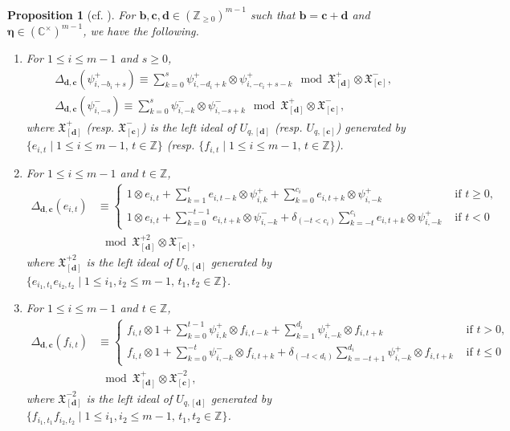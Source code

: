 \documentclass[12pt]{amsart}
\newtheorem{prop}[thm]{Proposition}
\numberwithin{equation}{thm}
\newcommand\CC{\mathbb C}
\newcommand\ZZ{\mathbb Z}
\newcommand\bb{\mathbf b}
\newcommand\bc{\mathbf c}
\newcommand\bd{\mathbf d}
\newcommand\fX{\mathfrak X}
\renewcommand\d{\delta}  %
\newcommand\D{\Delta}
\newcommand\Be{\boldsymbol\eta}
\newcommand{\dis}{\displaystyle}
\begin{document}
\begin{prop}[{cf. \cite[Lemma 12.4]{Zha24}}]
\label{Prop Ddc}
For $\bb, \bc, \bd \in (\ZZ_{\geq 0})^{m-1}$ such that $\bb = \bc + \bd$ and $\Be \in (\CC^{\times})^{m-1}$, 
we have the following. 
\begin{enumerate}
\item For $1\leq i \leq m-1$ and $s \geq 0$, 
\begin{align*}
&\D_{\bd, \bc} (\psi_{i, - b_i +s}^+) 
	\equiv \sum_{k=0}^s \psi_{i, - d_i +k}^+ \otimes \psi_{i, - c_i + s -k}^+ 
		\mod \fX^+_{[\bd]} \otimes \fX_{[\bc]}^-, 
\\
& \D_{\bd, \bc} (\psi_{i, -s}^-) 
	\equiv \sum_{k=0}^s \psi_{i, - k}^- \otimes \psi_{i, - s +k}^-  
		\mod \fX^+_{[\bd]} \otimes \fX_{[\bc]}^-, 
\end{align*}
where 
$\fX_{[\bd]}^+$ (resp. $\fX_{[\bc]}^-$) is the left ideal of $U_{q,[\bd]}$ (resp. $U_{q,[\bc]}$) 
generated by $\{ e_{i,t} \mid 1\leq i \leq m-1, \, t \in \ZZ\}$ 
(resp. $\{ f_{i,t} \mid 1\leq i \leq m-1, \, t \in \ZZ\}$). 

\item 
For $1\leq  i \leq m-1$ and $t \in \ZZ$, 
\begin{align*}
\D_{\bd, \bc} (e_{i,t}) 
	&\equiv \begin{cases}
		\dis 
		1 \otimes e_{i,t} + \sum_{k=1}^t e_{i, t-k} \otimes \psi_{i,k}^+ + \sum_{k=0}^{c_i} e_{i, t+k} \otimes \psi_{i, -k}^+ 
			& \text{ if } t \geq 0, 
		\\
		\dis 
		1 \otimes e_{i,t} + \sum_{k=0}^{-t-1} e_{i, t +k} \otimes \psi_{i, -k}^- 
			+ \d_{( - t < c_i)} \sum_{k=-t}^{c_i} e_{i,t+k} \otimes \psi_{i, -k}^+ 
		& \text{ if } t <0 
	\end{cases}
	\\
	& \mod \fX_{[\bd]}^{+2} \otimes \fX_{[\bc]}^-, 
\end{align*}
where $\fX_{[\bd]}^{+2}$  is the left ideal of $U_{q,[\bd]}$  
generated by $\{ e_{i_1,t_1} e_{i_2,t_2} \mid 1\leq i_1, i_2\leq m-1, \, t_1,t_2 \in \ZZ\}$. 

\item 
For $1\leq  i \leq m-1$ and $t \in \ZZ$,  
\begin{align*}
\D_{\bd, \bc} (f_{i,t}) 
	& \equiv \begin{cases}
		\dis f_{i,t} \otimes 1 + \sum_{k=0}^{t-1} \psi_{i,k}^+ \otimes f_{i, t-k} + \sum_{k=1}^{d_i} \psi_{i, -k}^+ \otimes f_{i, t+k} 
			& \text{ if } t >0, 
		\\
		\dis 
		f_{i,t} \otimes 1 + \sum_{k=0}^{-t} \psi_{i, -k}^- \otimes f_{i, t+k} 
			+ \d_{( -  t < d_i)} \sum_{k=-t+1}^{d_i} \psi_{i, -k}^+ \otimes f_{i, t+k} 
			& \text{ if } t \leq 0 
	\end{cases}
	\\
	& \mod \fX_{[\bd]}^+ \otimes \fX_{[\bc]}^{-2}, 
\end{align*}
where $\fX_{[\bd]}^{-2}$  is the left ideal of $U_{q,[\bd]}$  
generated by $\{ f_{i_1,t_1} f_{i_2,t_2} \mid 1\leq i_1, i_2\leq m-1, \, t_1,t_2 \in \ZZ\}$. 
\end{enumerate}
\end{prop}
\end{document}
